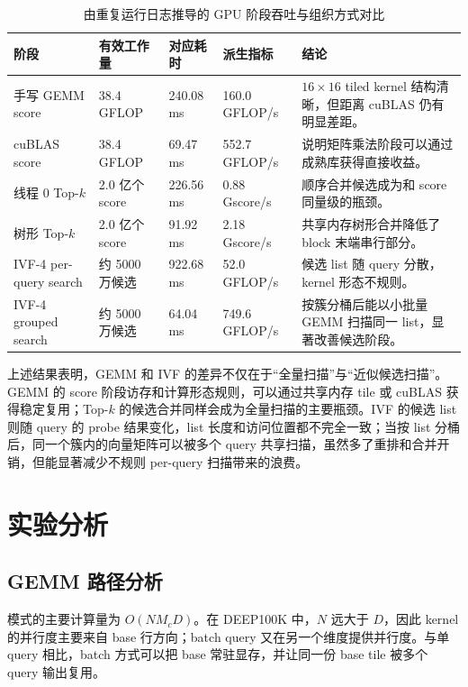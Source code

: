 \documentclass[a4paper,11pt,UTF8]{ctexart}
\newcommand{\code}[1]{\texttt{\detokenize{#1}}}
\begin{document}
\begin{table}[H]
  \centering\footnotesize
  \begin{tabularx}{\textwidth}{p{2.6cm}p{2.35cm}p{2.55cm}p{2.35cm}Y}
    \toprule
    阶段 & 有效工作量 & 对应耗时 & 派生指标 & 结论 \\
    \midrule
    手写 GEMM score & 38.4 GFLOP & 240.08 ms & 160.0 GFLOP/s & $16\times16$ tiled kernel 结构清晰，但距离 cuBLAS 仍有明显差距。\\
    cuBLAS score & 38.4 GFLOP & 69.47 ms & 552.7 GFLOP/s & 说明矩阵乘法阶段可以通过成熟库获得直接收益。\\
    线程 0 Top-$k$ & 2.0 亿个 score & 226.56 ms & 0.88 Gscore/s & 顺序合并候选成为和 score 同量级的瓶颈。\\
    树形 Top-$k$ & 2.0 亿个 score & 91.92 ms & 2.18 Gscore/s & 共享内存树形合并降低了 block 末端串行部分。\\
    IVF-4 per-query search & 约 5000 万候选 & 922.68 ms & 52.0 GFLOP/s & 候选 list 随 query 分散，kernel 形态不规则。\\
    IVF-4 grouped search & 约 5000 万候选 & 64.04 ms & 749.6 GFLOP/s & 按簇分桶后能以小批量 GEMM 扫描同一 list，显著改善候选阶段。\\
    \bottomrule
  \end{tabularx}
  \caption{由重复运行日志推导的 GPU 阶段吞吐与组织方式对比}
  \label{tab:derived_perf}
\end{table}

上述结果表明，GEMM 和 IVF 的差异不仅在于“全量扫描”与“近似候选扫描”。GEMM 的 score 阶段访存和计算形态规则，可以通过共享内存 tile 或 cuBLAS 获得稳定复用；Top-$k$ 的候选合并同样会成为全量扫描的主要瓶颈。IVF 的候选 list 则随 query 的 probe 结果变化，list 长度和访问位置都不完全一致；当按 list 分桶后，同一个簇内的向量矩阵可以被多个 query 共享扫描，虽然多了重排和合并开销，但能显著减少不规则 per-query 扫描带来的浪费。

\section{实验分析}

\subsection{GEMM 路径分析}

\code{gemm} 模式的主要计算量为 $O(NM_cD)$。在 DEEP100K 中，$N$ 远大于 $D$，因此 kernel 的并行度主要来自 base 行方向；batch query 又在另一个维度提供并行度。与单 query 相比，batch 方式可以把 base 常驻显存，并让同一份 base tile 被多个 query 输出复用。
\end{document}
